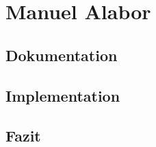 \section{Manuel Alabor}

\subsection*{Dokumentation}

\subsection*{Implementation}

\subsection*{Fazit}
